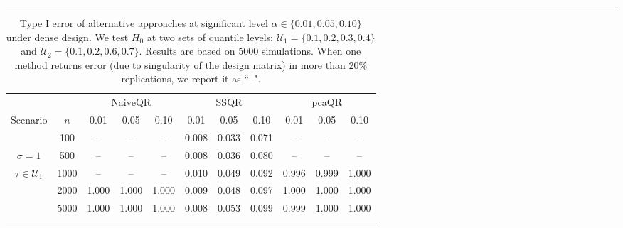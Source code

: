 \documentclass[times,sort&compress,3p]{elsarticle}
\theoremstyle{plain}%
\theoremstyle{definition}
\begin{document}
\begin{table}
\centering
\caption{Type I error of alternative approaches at significant level $\alpha \in \{0.01, 0.05, 0.10\}$ under dense design. We test $H_0$ at two sets of quantile levels:  $\mathcal{U}_1 =
		\{0.1, 0.2, 0.3, 0.4\}$ and $\mathcal{U}_2 = \{0.1, 0.2, 0.6, 0.7\}$. Results are based on $5000$ simulations.
When one method returns error (due to singularity of the design matrix) in more than 20\% replications, we report it as ``--". }
\label{table:type1.others} 
\hrule 
\begin{tabular}{ccccccccccc}
& &  \multicolumn{3}{c}{NaiveQR} & \multicolumn{3}{c}{SSQR} & \multicolumn{3}{c}{pcaQR} \\ %
Scenario & $n$ & 0.01 & 0.05 & 0.10 & 0.01 & 0.05 & 0.10 & 0.01 & 0.05 & 0.10 \\ %
\cmidrule(lr){3-5} \cmidrule(lr){6-8} \cmidrule(lr){9-11}
&  100 &     -- & -- & -- & 0.008 & 0.033 & 0.071 & -- & -- & -- \\ 
$\sigma = 1$ &  500 &     -- & -- & -- & 0.008 & 0.036 & 0.080 & -- & -- & -- \\ 
$ \tau \in \mathcal{U}_1$ &  1000 &     -- & -- & -- & 0.010 & 0.049 & 0.092 & 0.996 & 0.999 & 1.000 \\ 
&  2000 &     1.000 & 1.000 & 1.000 & 0.009 & 0.048 & 0.097 & 1.000 & 1.000 & 1.000 \\ 
&  5000 &     1.000 & 1.000 & 1.000 & 0.008 & 0.053 & 0.099 & 0.999 & 1.000 & 1.000 \\ 
\\

\end{tabular}
\end{table}
\end{document}
